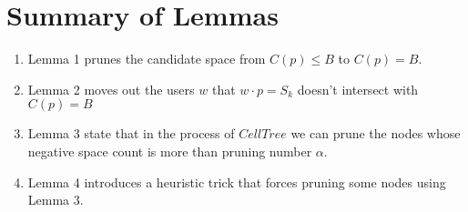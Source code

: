 \section{Summary of Lemmas}
\begin{enumerate}
    \item Lemma 1 prunes the candidate space from $C(p) \leq B$ to $C(p)=B$.
    \item Lemma 2 moves out the users $w$ that $w\cdot p=S_k$ doesn't intersect with $C(p)=B$
    \item Lemma 3 state that in the process of $CellTree$ we can prune the nodes whose negative space count is more than pruning number $\alpha$. 
    \item Lemma 4 introduces a heuristic trick that forces pruning some nodes using
    Lemma 3.   
  \end{enumerate}

